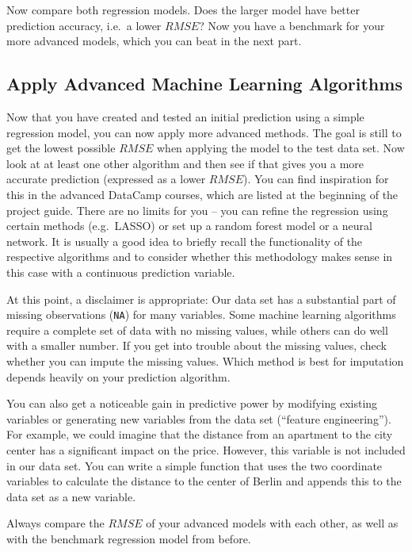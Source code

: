 \documentclass[
  11pt,
]{article}
\begin{document}
Now compare both regression models. Does the larger model have better prediction accuracy, i.e.~a lower \(RMSE\)? Now you have a benchmark for your more advanced models, which you can beat in the next part.

\hypertarget{apply-advanced-machine-learning-algorithms}{%
\subsection{Apply Advanced Machine Learning Algorithms}\label{apply-advanced-machine-learning-algorithms}}

Now that you have created and tested an initial prediction using a simple regression model, you can now apply more advanced methods. The goal is still to get the lowest possible \(RMSE\) when applying the model to the test data set. Now look at at least one other algorithm and then see if that gives you a more accurate prediction (expressed as a lower \(RMSE\)). You can find inspiration for this in the advanced DataCamp courses, which are listed at the beginning of the project guide. There are no limits for you -- you can refine the regression using certain methods (e.g.~LASSO) or set up a random forest model or a neural network. It is usually a good idea to briefly recall the functionality of the respective algorithms and to consider whether this methodology makes sense in this case with a continuous prediction variable.

At this point, a disclaimer is appropriate: Our data set has a substantial part of missing observations (\texttt{NA}) for many variables. Some machine learning algorithms require a complete set of data with no missing values, while others can do well with a smaller number. If you get into trouble about the missing values, check whether you can impute the missing values. Which method is best for imputation depends heavily on your prediction algorithm.

You can also get a noticeable gain in predictive power by modifying existing variables or generating new variables from the data set (``feature engineering''). For example, we could imagine that the distance from an apartment to the city center has a significant impact on the price. However, this variable is not
included in our data set. You can write a simple function that uses the two coordinate variables to calculate the distance to the center of Berlin and appends this to the data set as a new variable.

Always compare the \(RMSE\) of your advanced models with each other, as well as with the benchmark regression model from before.
\end{document}
